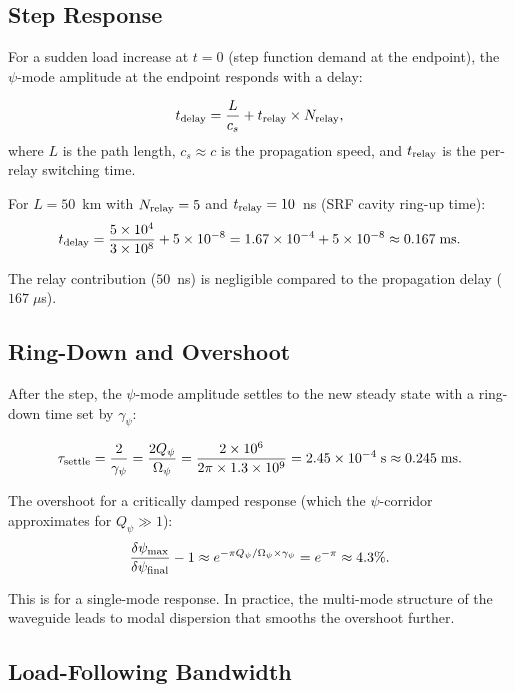 \documentclass[aps,prd,twocolumn,superscriptaddress,nofootinbib]{revtex4-2}
\newcommand{\Qpsi}{Q_\psi}
\newcommand{\Opsi}{\Omega_\psi}
\begin{document}
\subsection{Step Response}

For a sudden load increase at $t = 0$ (step function demand at
the endpoint), the $\psi$-mode amplitude at the endpoint responds
with a delay:

\begin{equation}
t_{\rm delay} = \frac{L}{c_s} + t_{\rm relay}\times N_{\rm relay},
\label{eq:delay}
\end{equation}
where $L$ is the path length, $c_s \approx c$ is the propagation
speed, and $t_{\rm relay}$ is the per-relay switching time.

For $L = 50$~km with $N_{\rm relay} = 5$ and
$t_{\rm relay} = 10$~ns (SRF cavity ring-up time):
\begin{equation}
t_{\rm delay} = \frac{5\times10^4}{3\times10^8} + 5\times10^{-8}
= 1.67\times10^{-4} + 5\times10^{-8}
\approx 0.167\;\si{ms}.
\end{equation}

The relay contribution ($50$~ns) is negligible compared to the
propagation delay ($167\;\mu$s).

\subsection{Ring-Down and Overshoot}

After the step, the $\psi$-mode amplitude settles to the new
steady state with a ring-down time set by $\gamma_\psi$:

\begin{equation}
\tau_{\rm settle} = \frac{2}{\gamma_\psi}
= \frac{2\Qpsi}{\Opsi}
= \frac{2\times10^6}{2\pi\times1.3\times10^9}
= 2.45\times10^{-4}\;\si{s} \approx 0.245\;\si{ms}.
\label{eq:settle}
\end{equation}

The overshoot for a critically damped response (which the
$\psi$-corridor approximates for $\Qpsi \gg 1$):
\begin{equation}
\frac{\delta\psi_{\rm max}}{\delta\psi_{\rm final}} - 1
\approx e^{-\pi\Qpsi/\Opsi\times\gamma_\psi}
= e^{-\pi} \approx 4.3\%.
\end{equation}

This is for a single-mode response. In practice, the multi-mode
structure of the waveguide leads to modal dispersion that smooths
the overshoot further.

\subsection{Load-Following Bandwidth}
\end{document}
